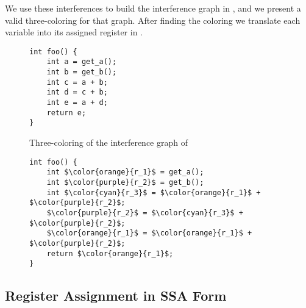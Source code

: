 We use these interferences to build the interference graph in , and we present a valid three-coloring for that graph. After finding the coloring we translate each variable into its assigned register in .

\begin{figure}[ht]
\centering
\begin{minipage}{0.48\textwidth}
\lstset{style=C}
\begin{lstlisting}[caption={C program returning $2a + 3b$}, label={fig:ig1}]
int foo() {
    int a = get_a();
    int b = get_b();
    int c = a + b;
    int d = c + b;
    int e = a + d;
    return e;
}
\end{lstlisting}
\end{minipage}
\hfill
\begin{minipage}{0.48\textwidth}
  \centering
  \caption{Three-coloring of the interference graph of }
  \label{fig:ig2}
\end{minipage}
\end{figure}

\begin{figure}
\label{fig:ig3}
\lstset{style=C}
\begin{lstlisting}[caption={Program shown in \Cref{fig:ig1} after \gls{ra}}, label={fig:ig3}]
int foo() {
    int $\color{orange}{r_1}$ = get_a();
    int $\color{purple}{r_2}$ = get_b();
    int $\color{cyan}{r_3}$ = $\color{orange}{r_1}$ + $\color{purple}{r_2}$;
    $\color{purple}{r_2}$ = $\color{cyan}{r_3}$ + $\color{purple}{r_2}$;
    $\color{orange}{r_1}$ = $\color{orange}{r_1}$ + $\color{purple}{r_2}$;
    return $\color{orange}{r_1}$;
}
\end{lstlisting}
\end{figure}

\subsection{Register Assignment in SSA Form}
\label{subsec:ssara}

